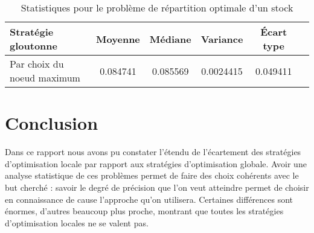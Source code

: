 \documentclass[a4paper,english,french]{article}
\begin{document}
\begin{center}
\begin{table}[htbp]
    \centering
    \begin{tabular}{lccccc}
        \toprule
        Stratégie gloutonne             & Moyenne   & Médiane   & Variance      & Écart type    \\
        \midrule
        Par choix du noeud maximum  & 0.084741 & 0.085569 & 0.0024415    & 0.049411      \\
        \bottomrule
    \end{tabular}
    \caption{Statistiques pour le problème de répartition optimale d'un stock}
\end{table}
\end{center}

\section{Conclusion}

Dans ce rapport nous avons pu constater l'étendu de l'écartement des stratégies d'optimisation locale par rapport aux stratégies d'optimisation globale. Avoir une analyse statistique de ces problèmes permet de faire des choix cohérents avec le but cherché : savoir le degré de précision que l'on veut atteindre permet de choisir en connaissance de cause l'approche qu'on utilisera. Certaines différences sont énormes, d'autres beaucoup plus proche, montrant que toutes les stratégies d'optimisation locales ne se valent pas.

\newpage
\listoffigures
\listoftables
\end{document}
